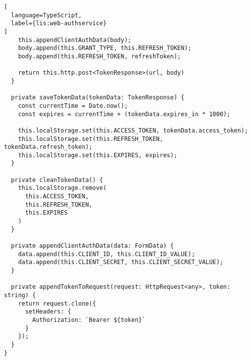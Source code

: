 \begin{lstlisting}[
  language=TypeScript,
  label={lis:web-authservice}
]
    this.appendClientAuthData(body);
    body.append(this.GRANT_TYPE, this.REFRESH_TOKEN);
    body.append(this.REFRESH_TOKEN, refreshToken);

    return this.http.post<TokenResponse>(url, body)
  }

  private saveTokenData(tokenData: TokenResponse) {
    const currentTime = Date.now();
    const expires = currentTime + (tokenData.expires_in * 1000);

    this.localStorage.set(this.ACCESS_TOKEN, tokenData.access_token);
    this.localStorage.set(this.REFRESH_TOKEN, tokenData.refresh_token);
    this.localStorage.set(this.EXPIRES, expires);
  }

  private cleanTokenData() {
    this.localStorage.remove(
      this.ACCESS_TOKEN,
      this.REFRESH_TOKEN,
      this.EXPIRES
    )
  }

  private appendClientAuthData(data: FormData) {
    data.append(this.CLIENT_ID, this.CLIENT_ID_VALUE);
    data.append(this.CLIENT_SECRET, this.CLIENT_SECRET_VALUE);
  }

  private appendTokenToRequest(request: HttpRequest<any>, token: string) {
    return request.clone({
      setHeaders: {
        Authorization: `Bearer ${token}`
      }
    });
  }
}
\end{lstlisting}